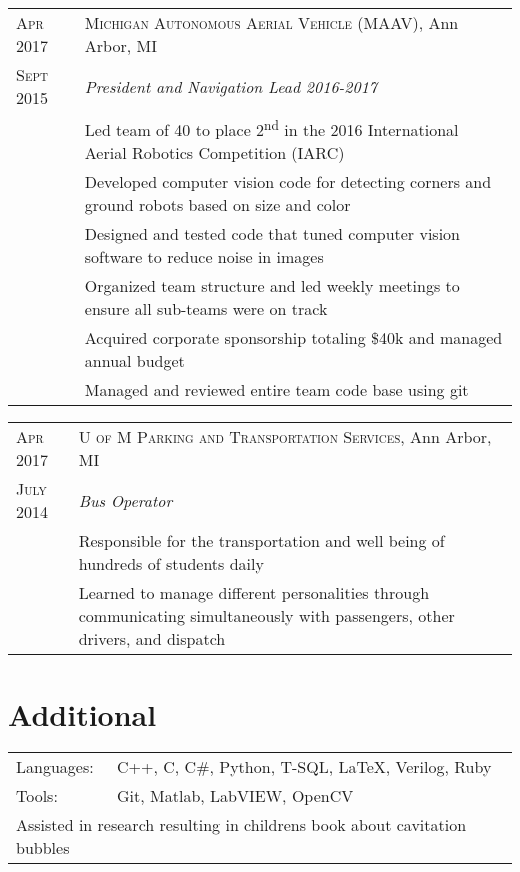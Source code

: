 \documentclass[a4paper,12pt]{article} %
\begin{document}

\begin{tabular}{R{2.1cm}|p{15.5cm}}
\textsc{Apr 2017} & \textsc{Michigan Autonomous Aerial Vehicle (MAAV)}, Ann Arbor, MI\\
\textsc{Sept 2015} & \emph{President and Navigation Lead 2016-2017} \\
& \footnotesize{Led team of 40 to place 2\textsuperscript{nd} in the 2016
  International Aerial Robotics Competition (IARC)} \\
& \footnotesize{Developed computer vision code for detecting corners and
  ground robots based on size and color} \\
& \footnotesize{Designed and tested code that tuned computer vision software to
  reduce noise in images} \\
& \footnotesize{Organized team structure and led weekly meetings to ensure all
  sub-teams were on track} \\
& \footnotesize{Acquired corporate sponsorship totaling \$40k and managed annual
  budget} \\
& \footnotesize{Managed and reviewed entire team code base using git} \\
\end{tabular}


\begin{tabular}{R{2.1cm}|p{15.5cm}}
\textsc{Apr 2017} & \textsc{U of M Parking and Transportation Services}, Ann Arbor, MI\\
\textsc{July 2014} & \emph{Bus Operator} \\
& \footnotesize{Responsible for the transportation and well being of hundreds
  of students daily} \\
& \footnotesize{Learned to manage different personalities through communicating
  simultaneously with passengers, other drivers, and dispatch} \\
\end{tabular}


\section{Additional}

\begin{tabular}{ll}
Languages: & C++, C, C\#, Python, T-SQL, \LaTeX, Verilog, Ruby \\
Tools: & Git, Matlab, LabVIEW, OpenCV \\
\multicolumn{2}{l}{Assisted in research resulting in childrens book about
  cavitation bubbles}\\
\end{tabular}

\clearpage %
\end{document}
